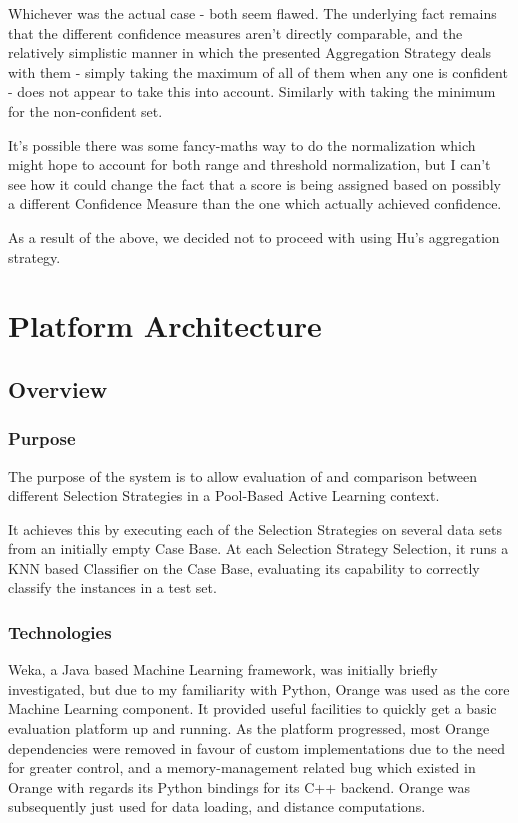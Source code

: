 \documentclass[a4paper,11pt]{report}
\begin{document}
Whichever was the actual case - both seem flawed. The underlying fact remains that the different confidence measures aren't directly comparable, and the relatively simplistic manner in which the presented Aggregation Strategy deals with them - simply taking the maximum of all of them when any one is confident - does not appear to take this into account. Similarly with taking the minimum for the non-confident set.

It's possible there was some fancy-maths way to do the normalization which might hope to account for both range and threshold normalization, but I can't see how it could change the fact that a score is being assigned based on possibly a different Confidence Measure than the one which actually achieved confidence.

As a result of the above, we decided not to proceed with using Hu's aggregation strategy.

\chapter{Platform Architecture\label{cha:platarch}}
\section{Overview}
\subsection{Purpose}
The purpose of the system is to allow evaluation of and comparison between different Selection Strategies in a Pool-Based Active Learning context.

It achieves this by executing each of the Selection Strategies on several data sets from an initially empty Case Base. At each Selection Strategy Selection, it runs a KNN based Classifier on the Case Base, evaluating its capability to correctly classify the instances in a test set.

\subsection{Technologies}
Weka\cite{prog:weka}, a Java based Machine Learning framework, was initially briefly investigated, but due to my familiarity with Python, Orange\cite{prog:orange} was used as the core Machine Learning component. It provided useful facilities to quickly get a basic evaluation platform up and running. As the platform progressed, most Orange dependencies were removed in favour of custom implementations due to the need for greater control, and a memory-management related bug which existed in Orange with regards its Python bindings for its C++ backend. Orange was subsequently just used for data loading, and distance computations.
\end{document}
